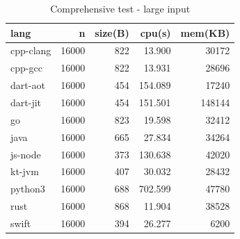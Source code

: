 \begin{table}[ht]
    \caption{Comprehensive test - large input}
    \label{tab:mandelbrot-1}
    \begin{center}
        \begin{tabular}{lrrrr}
            \toprule
            lang      & n     & size(B) & cpu(s)  & mem(KB) \\
            \midrule
            cpp-clang & 16000 & 822     & 13.900  & 30172   \\
            cpp-gcc   & 16000 & 822     & 13.931  & 28696   \\
            dart-aot  & 16000 & 454     & 154.089 & 17240   \\
            dart-jit  & 16000 & 454     & 151.501 & 148144  \\
            go        & 16000 & 823     & 19.598  & 32412   \\
            java      & 16000 & 665     & 27.834  & 34264   \\
            js-node   & 16000 & 373     & 130.638 & 42020   \\
            kt-jvm    & 16000 & 407     & 30.032  & 28432   \\
            python3   & 16000 & 688     & 702.599 & 47780   \\
            rust      & 16000 & 868     & 11.904  & 38528   \\
            swift     & 16000 & 394     & 26.277  & 6200    \\
            \bottomrule
        \end{tabular}
    \end{center}
\end{table}


